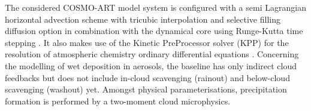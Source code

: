 The  considered  COSMO-ART model  system  is  configured  with a  semi
Lagrangian horizontal advection scheme with tricubic interpolation and
selective filling  diffusion option in combination  with the dynamical
core  using Runge-Kutta  time  stepping \citep{COSMO-PartI-2011}.   It
also  makes use  of  the  Kinetic PreProcessor  solver  (KPP) for  the
resolution  of atmospheric  chemistry ordinary  differential equations
\citep{Damian-2002}.   Concerning the modelling  of wet  deposition in
aerosols, the baseline has only  indirect cloud feedbacks but does not
include  in-cloud  scavenging  (rainout)  and  below-cloud  scavenging
(washout)  yet.   Amongst  physical  parameterisations,  precipitation
formation is performed by a two-moment cloud microphysics.
